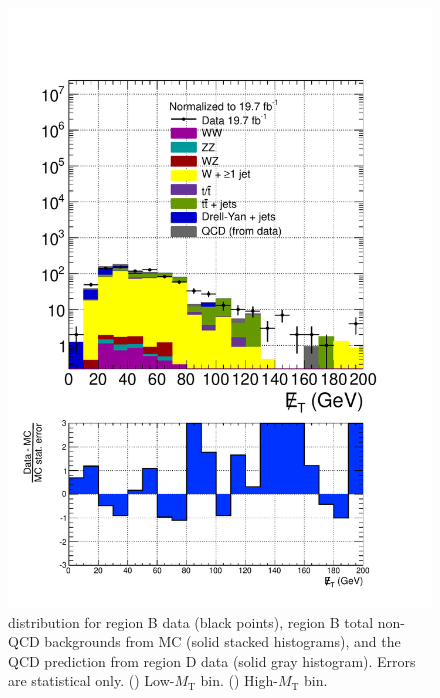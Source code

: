 \begin{figure}[hbtp]
\begin{center}
    \includegraphics[width=\cmsFigWidth]{figures/dataVsMCQCD_MET_highMT_v87}
    \caption{\ETslash distribution for region B data (black points), region B total non-QCD backgrounds from MC (solid stacked histograms), and the QCD prediction from region D data (solid gray histogram).  Errors are statistical only. (\cmsLeft) Low-$M_{\text{T}}$ bin. (\cmsRight) High-$M_{\text{T}}$ bin.}
    \label{fig:regB-data-MC-MET}
  \end{center}
\end{figure}

